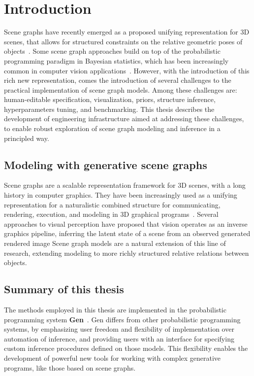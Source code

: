 \chapter{Introduction}
Scene graphs have recently emerged as a proposed unifying representation for 3D scenes, that allows for structured constraints on the relative geometric poses of objects~\cite{bzinberg2020scenegraphs, raboh2020differentiable, johnson2018image}.
Some scene graph approaches build on top of the probabilistic programming paradigm in Bayesian statistics, which has been increasingly common in computer vision applications~\cite{battaglia2013simulation, izatt2020generative, jampani2015informed, kulkarni2015picture, mansinghka2013approximate, wu2017learning, wu2017neural, romaszko2017vision}.
However, with the introduction of this rich new representation, comes the introduction of several challenges to the practical implementation of scene graph models.
Among these challenges are: human-editable specification, visualization, priors, structure inference, hyperparameters tuning, and benchmarking.
This thesis describes the development of engineering infrastructure aimed at addressing these challenges, to enable robust exploration of scene graph modeling and inference in a principled way.

\pagebreak

\section{Modeling with generative scene graphs}
Scene graphs are a scalable representation framework for 3D scenes, with a long history in computer graphics.
They have been increasingly used as a unifying representation for a naturalistic combined structure for communicating, rendering, execution, and modeling in 3D graphical programs~\cite{sowizral2000scene}.
Several approaches to visual perception have proposed that vision operates as an inverse graphics pipeline, inferring the latent state of a scene from an observed generated rendered image \cite{romaszko2017vision, DBLP:journals/corr/KulkarniWKT15, moreno2016overcoming}
Scene graph models are a natural extension of this line of research, extending modeling to more richly structured relative relations between objects.

\section{Summary of this thesis}
The methods employed in this thesis are implemented in the probabilistic programming system \textbf{Gen}~\cite{Cusumano-Towner:2019:GGP:3314221.3314642}.
Gen differs from other probabilistic programming systems, by emphasizing user freedom and flexibility of implementation over automation of inference, and providing users with an interface for specifying custom inference procedures defined on those models.
This flexibility enables the development of powerful new tools for working with complex generative programs, like those based on scene graphs.

